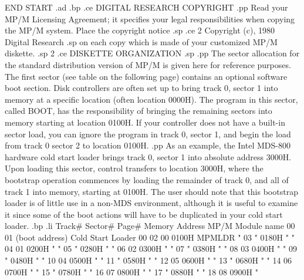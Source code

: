            END    START
.ad
.bp
.ce
DIGITAL RESEARCH COPYRIGHT
.pp
Read your MP/M Licensing Agreement; it specifies your legal
responsibilities when copying the MP/M system.  Place the copyright notice
.sp
.ce 2
Copyright (c), 1980
Digital Research
.sp
on each copy which is made of your customized MP/M diskette.
.sp 2
.ce
DISKETTE ORGANIZATION
.sp
.pp
The sector allocation for the standard distribution version of MP/M is
given here for reference purposes.  The first sector (see table on the following page)
contains an optional software boot section.  Disk controllers are often
set up to bring track 0, sector 1 into memory at a specific location
(often location 0000H).  The program in this sector, called BOOT, has
the responsibility of bringing the remaining sectors into memory
starting at location 0100H.  If your controller does not have a
built-in sector load, you can ignore the program in track 0, sector 1,
and begin the load from track 0 sector 2 to location 0100H.
.pp
As an example, the Intel MDS-800 hardware cold start loader brings
track 0, sector 1 into absolute address 3000H.
Upon loading this sector, control transfers to location 3000H, where
the bootstrap operation commences
by loading the remainder of track 0, and all of track 1 into
memory, starting at 0100H.  The user should note that this bootstrap loader
is of little use in a non-MDS environment, although it is useful to
examine it since some of the boot actions will have to be duplicated in
your cold start loader.
.bp
.li
     Track#  Sector#   Page#    Memory Address    MP/M Module name
       00      01               (boot address)    Cold Start Loader
       00      02       00          0100H              MPMLDR
        "      03        "          0180H               "
        "      04       01          0200H               "
        "      05        "          0280H               "
        "      06       02          0300H               "
        "      07        "          0380H               "
        "      08       03          0400H               "
        "      09        "          0480H               "
        "      10       04          0500H               "
        "      11        "          0580H               "
        "      12       05          0600H               "
        "      13        "          0680H               "
        "      14       06          0700H               "
        "      15        "          0780H               "
        "      16       07          0800H               "
        "      17        "          0880H               "
        "      18       08          0900H               "
